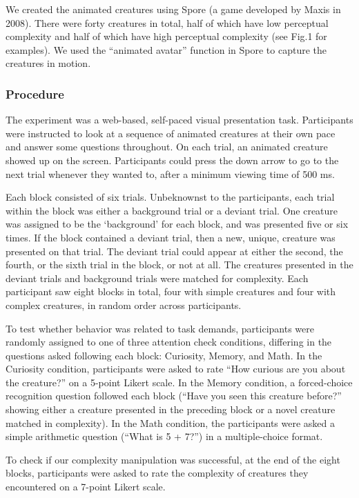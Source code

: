 \documentclass[10pt, letterpaper]{article}
\begin{document}
We created the animated creatures using Spore (a game developed by Maxis
in 2008). There were forty creatures in total, half of which have low
perceptual complexity and half of which have high perceptual complexity
(see Fig.1 for examples). We used the ``animated avatar'' function in
Spore to capture the creatures in motion.

\hypertarget{procedure}{%
\subsubsection{Procedure}\label{procedure}}

The experiment was a web-based, self-paced visual presentation task.
Participants were instructed to look at a sequence of animated creatures
at their own pace and answer some questions throughout. On each trial,
an animated creature showed up on the screen. Participants could press
the down arrow to go to the next trial whenever they wanted to, after a
minimum viewing time of 500 ms.

Each block consisted of six trials. Unbeknownst to the participants,
each trial within the block was either a background trial or a deviant
trial. One creature was assigned to be the `background' for each block,
and was presented five or six times. If the block contained a deviant
trial, then a new, unique, creature was presented on that trial. The
deviant trial could appear at either the second, the fourth, or the
sixth trial in the block, or not at all. The creatures presented in the
deviant trials and background trials were matched for complexity. Each
participant saw eight blocks in total, four with simple creatures and
four with complex creatures, in random order across participants.

To test whether behavior was related to task demands, participants were
randomly assigned to one of three attention check conditions, differing
in the questions asked following each block: Curiosity, Memory, and
Math. In the Curiosity condition, participants were asked to rate ``How
curious are you about the creature?'' on a 5-point Likert scale. In the
Memory condition, a forced-choice recognition question followed each
block (``Have you seen this creature before?'' showing either a creature
presented in the preceding block or a novel creature matched in
complexity). In the Math condition, the participants were asked a simple
arithmetic question (``What is 5 + 7?'') in a multiple-choice format.

To check if our complexity manipulation was successful, at the end of
the eight blocks, participants were asked to rate the complexity of
creatures they encountered on a 7-point Likert scale.
\end{document}
